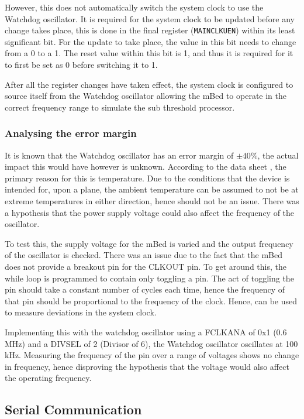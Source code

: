 However, this does not automatically switch the system clock to use the Watchdog oscillator. It is required for the system clock to be updated before any change takes place, this is done in the final register (\verb|MAINCLKUEN|) within its least significant bit. For the update to take place, the value in this bit needs to change from a 0 to a 1. The reset value within this bit is 1, and thus it is required for it to first be set as 0 before switching it to 1.

After all the register changes have taken effect, the system clock is configured to source itself from the Watchdog oscillator allowing the mBed to operate in the correct frequency range to simulate the sub threshold processor.

\subsubsection{Analysing the error margin}

It is known that the Watchdog oscillator has an error margin of $ \pm 40\%$, the actual impact this would have however is unknown. According to the data sheet \cite{mbed_not_datasheet}, the primary reason for this is temperature. Due to the conditions that the device is intended for, upon a plane, the ambient temperature can be assumed to not be at extreme temperatures in either direction, hence should not be an issue. There was a hypothesis that the power supply voltage could also affect the frequency of the oscillator. 

To test this, the supply voltage for the mBed is varied and the output frequency of the oscillator is checked. There was an issue due to the fact that the mBed does not provide a breakout pin for the CLKOUT pin. To get around this, the while loop is programmed to contain only toggling a pin. The act of toggling the pin should take a constant number of cycles each time, hence the frequency of that pin should be proportional to the frequency of the clock. Hence, can be used to measure deviations in the system clock.

Implementing this with the watchdog oscillator using a FCLKANA of 0x1 (0.6 MHz) and a DIVSEL of 2 (Divisor of 6), the Watchdog oscillator oscillates at 100 kHz. Measuring the frequency of the pin over a range of voltages shows no change in frequency, hence disproving the hypothesis that the voltage would also affect the operating frequency.

\subsection{Serial Communication}

